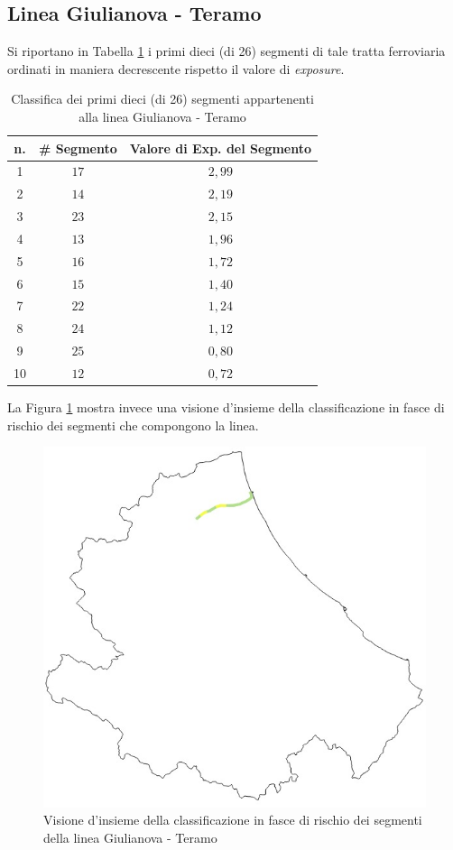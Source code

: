 \subsection{Linea Giulianova - Teramo}
Si riportano in Tabella \ref{classificagiulianovateramo} i primi dieci (di 26) segmenti di tale tratta ferroviaria ordinati in maniera decrescente rispetto il valore di \textit{exposure}.
\begin{table}[h]
\centering
\begin{tabular}{|c|c|c|}
\hline
\rowcolor{lightgray}
n. & \# Segmento & Valore di Exp. del Segmento \\ \hline \rowcolor{icterine}
1  & $17$        & $2,99$                      \\ \hline \rowcolor{icterine}
2  & $14$        & $2,19$                      \\ \hline \rowcolor{icterine}
3  & $23$        & $2,15$                      \\ \hline \rowcolor{icterine}
4  & $13$        & $1,96$                      \\ \hline \rowcolor{icterine}
5  & $16$        & $1,72$                      \\ \hline \rowcolor{icterine}
6  & $15$        & $1,40$                      \\ \hline \rowcolor{icterine}
7  & $22$       & $1,24$                      \\ \hline \rowcolor{icterine}
8  & $24$        & $1,12$                      \\ \hline \rowcolor{inchworm}
9  & $25$        & $0,80$                      \\ \hline \rowcolor{inchworm}
10 & $12$        & $0,72$                      \\ \hline
\end{tabular}
\caption{Classifica dei primi dieci (di 26) segmenti appartenenti alla linea Giulianova - Teramo}
\label{classificagiulianovateramo}
\end{table}
\newline
La Figura \ref{giulianovateramo} mostra invece una visione d'insieme della classificazione in fasce di rischio dei segmenti che compongono la linea.
\begin{figure}[h]
\centering
\includegraphics[width=0.4\linewidth]{img/teramogiulianova.jpeg}
\caption{Visione d'insieme della classificazione in fasce di rischio dei segmenti della linea Giulianova - Teramo}
\label{giulianovateramo}
\end{figure}
